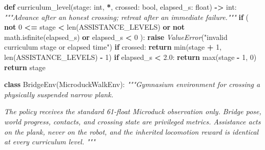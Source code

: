 \documentclass[
  chinese,
  11pt,
  letterpaper,
]{article}
\newenvironment{Shaded}{\begin{snugshade}}{\end{snugshade}}
\newcommand{\BuiltInTok}[1]{#1}
\newcommand{\CommentTok}[1]{\textcolor[rgb]{0.56,0.35,0.01}{\textit{#1}}}
\newcommand{\ControlFlowTok}[1]{\textcolor[rgb]{0.13,0.29,0.53}{\textbf{#1}}}
\newcommand{\DecValTok}[1]{\textcolor[rgb]{0.00,0.00,0.81}{#1}}
\newcommand{\FloatTok}[1]{\textcolor[rgb]{0.00,0.00,0.81}{#1}}
\newcommand{\KeywordTok}[1]{\textcolor[rgb]{0.13,0.29,0.53}{\textbf{#1}}}
\newcommand{\NormalTok}[1]{#1}
\newcommand{\OperatorTok}[1]{\textcolor[rgb]{0.81,0.36,0.00}{\textbf{#1}}}
\newcommand{\PreprocessorTok}[1]{\textcolor[rgb]{0.56,0.35,0.01}{\textit{#1}}}
\newcommand{\StringTok}[1]{\textcolor[rgb]{0.31,0.60,0.02}{#1}}
\renewenvironment{Shaded}{\par\smallskip}{\par\smallskip}
\begin{document}
\begin{Shaded}
\begin{Highlighting}[]
\KeywordTok{def}\NormalTok{ curriculum\_level(stage: }\BuiltInTok{int}\NormalTok{, }\OperatorTok{*}\NormalTok{, crossed: }\BuiltInTok{bool}\NormalTok{, elapsed\_s: }\BuiltInTok{float}\NormalTok{) }\OperatorTok{{-}\textgreater{}} \BuiltInTok{int}\NormalTok{:}
    \CommentTok{"""Advance after an honest crossing; retreat after an immediate failure."""}
    \ControlFlowTok{if}\NormalTok{ (}
        \KeywordTok{not} \DecValTok{0} \OperatorTok{\textless{}=}\NormalTok{ stage }\OperatorTok{\textless{}} \BuiltInTok{len}\NormalTok{(ASSISTANCE\_LEVELS)}
        \KeywordTok{or} \KeywordTok{not}\NormalTok{ math.isfinite(elapsed\_s)}
        \KeywordTok{or}\NormalTok{ elapsed\_s }\OperatorTok{\textless{}} \DecValTok{0}
\NormalTok{    ):}
        \ControlFlowTok{raise} \PreprocessorTok{ValueError}\NormalTok{(}\StringTok{"invalid curriculum stage or elapsed time"}\NormalTok{)}
    \ControlFlowTok{if}\NormalTok{ crossed:}
        \ControlFlowTok{return} \BuiltInTok{min}\NormalTok{(stage }\OperatorTok{+} \DecValTok{1}\NormalTok{, }\BuiltInTok{len}\NormalTok{(ASSISTANCE\_LEVELS) }\OperatorTok{{-}} \DecValTok{1}\NormalTok{)}
    \ControlFlowTok{if}\NormalTok{ elapsed\_s }\OperatorTok{\textless{}} \FloatTok{2.0}\NormalTok{:}
        \ControlFlowTok{return} \BuiltInTok{max}\NormalTok{(stage }\OperatorTok{{-}} \DecValTok{1}\NormalTok{, }\DecValTok{0}\NormalTok{)}
    \ControlFlowTok{return}\NormalTok{ stage}


\KeywordTok{class}\NormalTok{ BridgeEnv(MicroduckWalkEnv):}
    \CommentTok{"""Gymnasium environment for crossing a physically suspended narrow plank.}

\CommentTok{    The policy receives the standard 61{-}float Microduck observation only.}
\CommentTok{    Bridge pose, world progress, contacts, and crossing state are privileged}
\CommentTok{    metrics. Assistance acts on the plank, never on the robot, and the inherited}
\CommentTok{    locomotion reward is identical at every curriculum level.}
\CommentTok{    """}


\end{Highlighting}
\end{Shaded}
\end{document}
